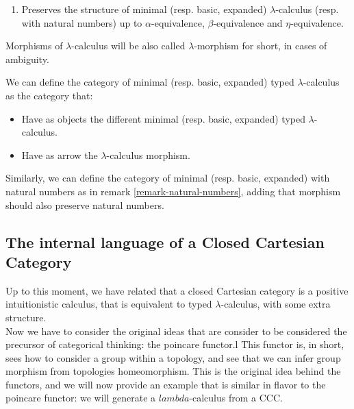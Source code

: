 \begin{definition}
\begin{definition}
\begin{enumerate}
  \item Preserves the structure of minimal (resp. basic, expanded) $\lambda$-calculus (resp. with natural numbers) up to $\alpha$-equivalence, $\beta$-equivalence and $\eta$-equivalence. 

  \end{enumerate}

  Morphisms of $\lambda$-calculus will be also called $\lambda$-morphism for short, in cases of ambiguity.
\end{definition}


\begin{definition}
  We can define the category of minimal (resp. basic, expanded) typed $\lambda$-calculus  as the category that:
  \begin{itemize}
  \item Have as objects the different minimal (resp. basic, expanded) typed $\lambda$-calculus.
  \item Have as arrow the $\lambda$-calculus morphism.
  \end{itemize}
  Similarly, we can define the category of minimal (resp. basic, expanded) with natural numbers as in remark \ref{remark-natural-numbers}, adding that morphism should also preserve natural numbers.
\end{definition}

\subsection{The internal language of a Closed Cartesian Category}

Up to this moment, we have related that a closed Cartesian category is a positive intuitionistic calculus, that is equivalent to  typed $\lambda$-calculus, with some extra structure.\\

Now we have to consider the original ideas that are consider to be considered the precursor of categorical thinking: the poincare functor.l This functor is, in short,  sees how to consider a group within a topology, and see that we can infer group morphism from topologies homeomorphism. This is the original idea behind the functors, and we will now provide an example that is similar in flavor to the poincare functor: we will generate a $lambda$-calculus from a CCC.\\ 




\end{definition}
